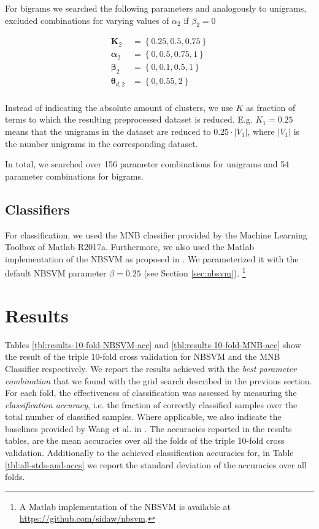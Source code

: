 For bigrams we searched the following parameters and analogously to unigrams, excluded combinations for varying values of $\alpha_2$ 
if $\beta_2 = 0$

\begin{equation*}
\begin{split}
	\boldsymbol K_2 &= \left\{ 0.25,  0.5, 0.75\right\} \\
	\boldsymbol \alpha_2 &= \left\{0, 0.5, 0.75, 1 \right\} \\
	\boldsymbol \beta_2 &= \left\{ 0, 0.1, 0.5, 1 \right\} \\
	\boldsymbol \theta_{d,2} &= \left\{ 0, 0.55, 2 \right \}  \\
\end{split}	      
\end{equation*}

Instead of indicating the absolute amount of clusters, we use $K$ as fraction of terms to which the resulting
preprocessed dataset is reduced. E.g. $K_1=0.25$ means that the unigrams in the dataset are reduced to $0.25 \cdot |V_1|$, where $|V_1|$ is the number
unigrams in the corresponding dataset.
  
In total, we searched over 156 parameter combinations for unigrams and 54 parameter combinations for bigrams. 
 
\subsection{Classifiers}
For classification, we used the MNB classifier provided by the Machine Learning Toolbox of Matlab R2017a.
Furthermore, we also used the Matlab implementation of the NBSVM as proposed in \cite{wang2012baselines}. 
We parameterized it with the default NBSVM parameter $\beta = 0.25$ (see Section \ref{sec:nbsvm}). 
\footnote{A Matlab implementation of the NBSVM is available at \url{https://github.com/sidaw/nbsvm}.}   

\section{Results}

Tables \ref{tbl:results-10-fold-NBSVM-acc} and \ref{tbl:results-10-fold-MNB-acc} show the result of the triple 10-fold cross validation 
for NBSVM and the MNB Classifier respectively. We report the results achieved 
with the \emph{best parameter combination} that we found with the grid search described in the previous section. 
For each fold, the effectiveness of classification was assessed by measuring the \emph{classification accuracy}, i.e. the fraction of correctly classified samples over 
the total number of classified samples. Where applicable, we also indicate the baselines provided by Wang et al. in \cite{wang2012baselines}. 
The accuracies reported in the results tables, are the mean accuracies over all the folds of the triple 10-fold cross validation.
Additionally to the achieved classification accuracies for, in Table \ref{tbl:all-stds-and-accs} we report the standard deviation of the accuracies over all folds.
 
